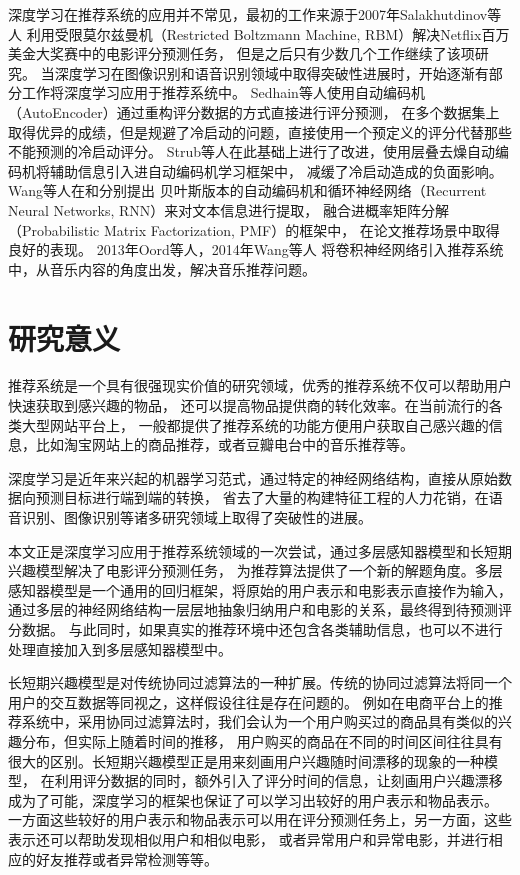深度学习在推荐系统的应用并不常见，最初的工作来源于2007年Salakhutdinov等人\parencite{salakhutdinov2007restricted}
利用受限莫尔兹曼机（Restricted Boltzmann Machine, RBM）解决Netflix百万美金大奖赛中的电影评分预测任务，
但是之后只有少数几个工作\parencite{phung2009ordinal}继续了该项研究。
当深度学习在图像识别和语音识别领域中取得突破性进展时，开始逐渐有部分工作将深度学习应用于推荐系统中。
Sedhain等人\parencite{sedhain2015autorec}使用自动编码机（AutoEncoder）通过重构评分数据的方式直接进行评分预测，
在多个数据集上取得优异的成绩，但是规避了冷启动的问题，直接使用一个预定义的评分代替那些不能预测的冷启动评分。
Strub等人\parencite{strub2016hybrid}在此基础上进行了改进，使用层叠去燥自动编码机将辅助信息引入进自动编码机学习框架中，
减缓了冷启动造成的负面影响。
Wang等人在\parencite{wang2015collaborative}和\parencite{wang2016collaborative}分别提出
贝叶斯版本的自动编码机和循环神经网络（Recurrent Neural Networks, RNN）来对文本信息进行提取，
融合进概率矩阵分解（Probabilistic Matrix Factorization, PMF）\parencite{salakhutdinov2007probabilistic}的框架中，
在论文推荐场景中取得良好的表现。
2013年Oord等人\parencite{van2013deep}，2014年Wang等人\parencite{wang2014improving}
将卷积神经网络引入推荐系统中，从音乐内容的角度出发，解决音乐推荐问题。

\section{研究意义}
推荐系统是一个具有很强现实价值的研究领域，优秀的推荐系统不仅可以帮助用户快速获取到感兴趣的物品，
还可以提高物品提供商的转化效率。在当前流行的各类大型网站平台上，
一般都提供了推荐系统的功能方便用户获取自己感兴趣的信息，比如淘宝网站上的商品推荐，或者豆瓣电台中的音乐推荐等。

深度学习是近年来兴起的机器学习范式，通过特定的神经网络结构，直接从原始数据向预测目标进行端到端的转换，
省去了大量的构建特征工程的人力花销，在语音识别、图像识别等诸多研究领域上取得了突破性的进展。

本文正是深度学习应用于推荐系统领域的一次尝试，通过多层感知器模型和长短期兴趣模型解决了电影评分预测任务，
为推荐算法提供了一个新的解题角度。多层感知器模型是一个通用的回归框架，将原始的用户表示和电影表示直接作为输入，
通过多层的神经网络结构一层层地抽象归纳用户和电影的关系，最终得到待预测评分数据。
与此同时，如果真实的推荐环境中还包含各类辅助信息，也可以不进行处理直接加入到多层感知器模型中。

长短期兴趣模型是对传统协同过滤算法的一种扩展。传统的协同过滤算法将同一个用户的交互数据等同视之，这样假设往往是存在问题的。
例如在电商平台上的推荐系统中，采用协同过滤算法时，我们会认为一个用户购买过的商品具有类似的兴趣分布，但实际上随着时间的推移，
用户购买的商品在不同的时间区间往往具有很大的区别。长短期兴趣模型正是用来刻画用户兴趣随时间漂移的现象的一种模型，
在利用评分数据的同时，额外引入了评分时间的信息，让刻画用户兴趣漂移成为了可能，深度学习的框架也保证了可以学习出较好的用户表示和物品表示。
一方面这些较好的用户表示和物品表示可以用在评分预测任务上，另一方面，这些表示还可以帮助发现相似用户和相似电影，
或者异常用户和异常电影，并进行相应的好友推荐或者异常检测等等。

